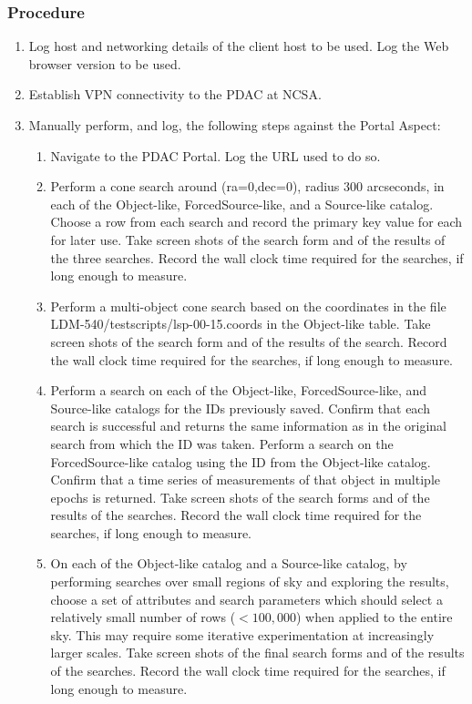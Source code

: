 \subsubsection{Procedure}

\begin{enumerate}

  \item{Log host and networking details of the client host to be used.
 Log the Web browser version to be used.}
  \item{Establish VPN connectivity to the PDAC at NCSA.}
  \item{Manually perform, and log, the following steps against the Portal Aspect:
    \begin{enumerate}
      \item{Navigate to the PDAC Portal.  Log the URL used to do so.}
      \item{Perform a cone search around (ra=0,dec=0), radius 300 arcseconds, in each of the Object-like, ForcedSource-like, and a Source-like catalog.
 Choose a row from each search and record the primary key value for each for later use.
 Take screen shots of the search form and of the results of the three searches.
 Record the wall clock time required for the searches, if long enough to measure.}
      \item{Perform a multi-object cone search based on the coordinates in the file LDM-540/test\textunderscore scripts/lsp-00-15.coords in the Object-like table.
 Take screen shots of the search form and of the results of the search.
 Record the wall clock time required for the searches, if long enough to measure.}
      \item{Perform a search on each of the Object-like, ForcedSource-like, and Source-like catalogs for the IDs previously saved.
 Confirm that each search is successful and returns the same information as in the original search from which the ID was taken.
 Perform a search on the ForcedSource-like catalog using the ID from the Object-like catalog.
 Confirm that a time series of measurements of that object in multiple epochs is returned.
 Take screen shots of the search forms and of the results of the searches.
 Record the wall clock time required for the searches, if long enough to measure.}
      \item{On each of the Object-like catalog and a Source-like catalog, by performing searches over small regions of sky and exploring the results, choose a set of attributes and search parameters which should select a relatively small number of rows ($<100,000$) when applied to the entire sky.
 This may require some iterative experimentation at increasingly larger scales.
 Take screen shots of the final search forms and of the results of the searches.
 Record the wall clock time required for the searches, if long enough to measure.}
    \end{enumerate}
  }

\end{enumerate}
